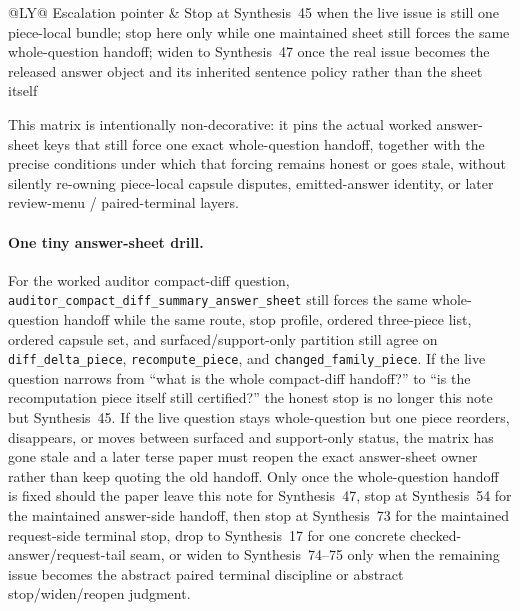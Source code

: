 \documentclass[11pt]{article}
\begin{document}
\begin{table}[t]
\begin{tabularx}{\linewidth}{@{}LY@{}}
Escalation pointer & Stop at Synthesis~45 when the live issue is still one piece-local bundle; stop here only while one maintained sheet still forces the same whole-question handoff; widen to Synthesis~47 once the real issue becomes the released answer object and its inherited sentence policy rather than the sheet itself \\
\bottomrule
\end{tabularx}
\caption{A forced public answer-sheet matrix. This is the smallest answer-side public answer later terse papers can quote directly when the live issue is whether one maintained whole-question handoff still forces the same ordered capsule bundle rather than merely which answer sheet exists in the abstract.}
\label{tab:forced-public-answer-sheet-matrix}
\end{table}

This matrix is intentionally non-decorative: it pins the actual worked answer-sheet keys that still force one exact whole-question handoff, together with the precise conditions under which that forcing remains honest or goes stale, without silently re-owning piece-local capsule disputes, emitted-answer identity, or later review-menu / paired-terminal layers.\cite{series:workedexample}

\paragraph{One tiny answer-sheet drill.}
For the worked auditor compact-diff question, \nolinkurl{auditor_compact_diff_summary_answer_sheet} still forces the same whole-question handoff while the same route, stop profile, ordered three-piece list, ordered capsule set, and surfaced/support-only partition still agree on \nolinkurl{diff_delta_piece}, \nolinkurl{recompute_piece}, and \nolinkurl{changed_family_piece}. If the live question narrows from ``what is the whole compact-diff handoff?'' to ``is the recomputation piece itself still certified?'' the honest stop is no longer this note but Synthesis~45. If the live question stays whole-question but one piece reorders, disappears, or moves between surfaced and support-only status, the matrix has gone stale and a later terse paper must reopen the exact answer-sheet owner rather than keep quoting the old handoff. Only once the whole-question handoff is fixed should the paper leave this note for Synthesis~47, stop at Synthesis~54 for the maintained answer-side handoff, then stop at Synthesis~73 for the maintained request-side terminal stop, drop to Synthesis~17 for one concrete checked-answer/request-tail seam, or widen to Synthesis~74--75 only when the remaining issue becomes the abstract paired terminal discipline or abstract stop/widen/reopen judgment.\cite{series:workedexample}
\end{document}

